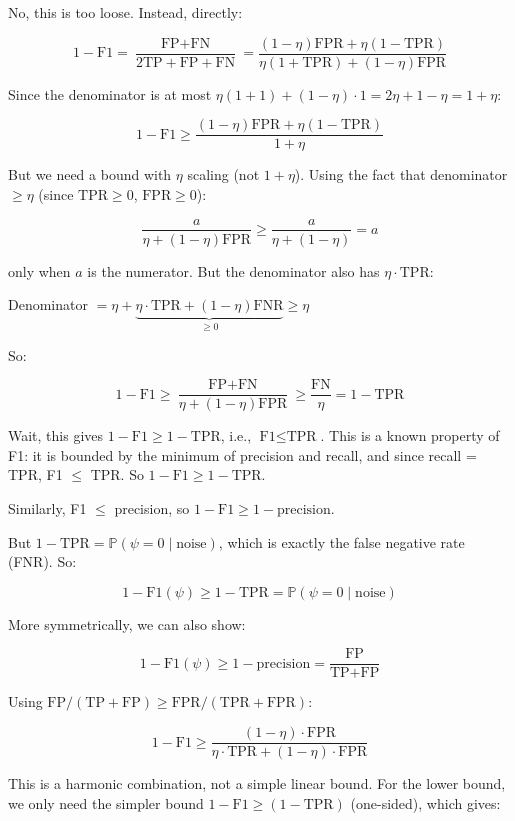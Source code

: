 \documentclass[
  12pt,
]{article}
\begin{document}
No, this is too loose. Instead, directly:

\[1 - \text{F1} = \frac{\text{FP} + \text{FN}}{2\text{TP} + \text{FP} + \text{FN}} = \frac{(1-\eta)\text{FPR} + \eta(1-\text{TPR})}{\eta(1+\text{TPR}) + (1-\eta)\text{FPR}}\]

Since the denominator is at most
\(\eta(1+1) + (1-\eta)\cdot 1 = 2\eta + 1 - \eta = 1 + \eta\):

\[1 - \text{F1} \geq \frac{(1-\eta)\text{FPR} + \eta(1-\text{TPR})}{1 + \eta}\]

But we need a bound with \(\eta\) scaling (not \(1+\eta\)). Using the
fact that denominator \(\geq \eta\) (since \(\text{TPR} \geq 0\),
\(\text{FPR} \geq 0\)):

\[\frac{a}{\eta + (1-\eta)\text{FPR}} \geq \frac{a}{\eta + (1-\eta)} = a\]

only when \(a\) is the numerator. But the denominator also has
\(\eta\cdot\text{TPR}\):

Denominator
\(= \eta + \underbrace{\eta\cdot\text{TPR} + (1-\eta)\text{FNR}}_{\geq 0} \geq \eta\)

So:

\[1 - \text{F1} \geq \frac{\text{FP} + \text{FN}}{\eta + (1-\eta)\text{FPR}} \geq \frac{\text{FN}}{\eta} = 1 - \text{TPR}\]

Wait, this gives \(1 - \text{F1} \geq 1 - \text{TPR}\), i.e.,
\(\text{F1} \leq \text{TPR}\). This is a known property of F1: it is
bounded by the minimum of precision and recall, and since recall = TPR,
F1 \(\leq\) TPR. So \(1 - \text{F1} \geq 1 - \text{TPR}\).

Similarly, F1 \(\leq\) precision, so
\(1 - \text{F1} \geq 1 - \text{precision}\).

But \(1 - \text{TPR} = \mathbb{P}(\psi=0 \mid \text{noise})\), which is
exactly the false negative rate (FNR). So:

\[1 - \text{F1}(\psi) \geq 1 - \text{TPR} = \mathbb{P}(\psi=0 \mid \text{noise})\]

More symmetrically, we can also show:

\[1 - \text{F1}(\psi) \geq 1 - \text{precision} = \frac{\text{FP}}{\text{TP} + \text{FP}}\]

Using
\(\text{FP}/(\text{TP}+\text{FP}) \geq \text{FPR}/(\text{TPR} + \text{FPR})\):

\[1 - \text{F1} \geq \frac{(1-\eta)\cdot\text{FPR}}{\eta\cdot\text{TPR} + (1-\eta)\cdot\text{FPR}}\]

This is a harmonic combination, not a simple linear bound. For the lower
bound, we only need the simpler bound
\(1 - \text{F1} \geq (1 - \text{TPR})\) (one-sided), which gives:
\end{document}
